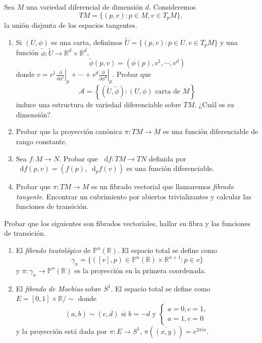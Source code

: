 \documentclass[11pt]{article}
\newcommand{\R}{{\mathbb{R}}}
\newcommand*\diff{\mathop{}\!\mathrm{d}}
\numberwithin{theorem}{subsection}
\begin{document}
\begin{question}
	Sea $M$ una variedad diferencial de dimensi\'on $d$. Consideremos $$TM = \{(p,v):p\in M, v\in T_pM\},$$ la uni\'on disjunta de los espacios tangentes.
	\begin{enumerate}
		\item Si $(U,\phi)$ es una carta, definimos $\widetilde{U} = \{(p,v):p\in U, v\in T_p M\}$ y una funci\'on $\widetilde{\phi}:\widetilde{U}\to\R^d\times\R^d$, $$\widetilde{\phi}(p,v)=\left(\phi(p),v^1,\cdots,v^d\right)$$ donde $v=v^1\left.\frac{\partial}{\partial \phi^1}\right|_p+\cdots+v^d\left.\frac{\partial}{\partial\phi^d}\right|_p$. Probar que $$\mathscr{A}=\left\{(\widetilde{U},\widetilde{\phi}) : (U,\phi)\text{ carta de }M \right\}$$ induce una estructura de variedad diferenciable sobre $TM$. ¿Cu\'al es su dimensi\'on?
		\item Probar que la proyecci\'on can\'onica $\pi:TM\to M$ es una funci\'on diferenciable de rango constante.
		\item Sea $f:M\to N$. Probar que $\diff f:TM\to TN$ definida por $\diff f(p,v) = (f(p),\diff_p f(v))$ es una funci\'on diferenciable.
		\item Probar que $\pi:TM\to M$ es un fibrado vectorial que llamaremos \textit{fibrado tangente}. Encontrar un cubrimiento por abiertos trivializantes y calcular las funciones de transici\'on. 
	\end{enumerate}
\end{question}

\begin{question}
	Probar que los siguientes son fibrados vectoriales, hallar su fibra y las funciones de transici\'on.
	\begin{enumerate}
		\item El \textit{fibrado tautol\'ogico} de $\mathbb{P}^n(\R)$. El espacio total se define como $$\gamma_n=\{([v],p)\in\mathbb{P}^n(\R)\times\R^{n+1}:p\in v\}$$ y $\pi:\gamma_n\to\mathbb{P}^n(\R)$ es la proyecci\'on en la primera coordenada.
		\pagebreak
		\item El \textit{fibrado de Moebius} sobre $S^1$. El espacio total se define como $E=[0,1]\times\R/\sim$ donde $$(a,b)\sim(c,d) \text{ si } b=-d \text{ y }\begin{cases}a=0, c=1,\\ a=1, c=0\end{cases}$$
		y la proyecci\'on est\'a dada por $\pi:E\to S^1$, $\pi(\overline{(x,y)}) = e^{2\pi i x}$.
	\end{enumerate}
	\vspace{1em}
	
\end{question}
\end{document}
